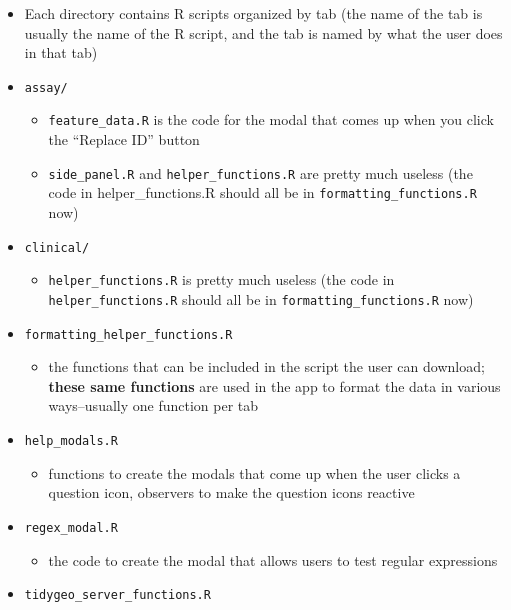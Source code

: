 \documentclass[]{article}
\providecommand{\tightlist}{%
  \setlength{\itemsep}{0pt}\setlength{\parskip}{0pt}}
\begin{document}
\begin{itemize}
  \begin{itemize}
  \tightlist
  \item
    Each directory contains R scripts organized by tab (the name of the
    tab is usually the name of the R script, and the tab is named by
    what the user does in that tab)
  \item
    \texttt{assay/}

    \begin{itemize}
    \tightlist
    \item
      \texttt{feature\_data.R} is the code for the modal that comes up
      when you click the ``Replace ID'' button
    \item
      \texttt{side\_panel.R} and \texttt{helper\_functions.R} are pretty
      much useless (the code in helper\_functions.R should all be in
      \texttt{formatting\_functions.R} now)
    \end{itemize}
  \item
    \texttt{clinical/}

    \begin{itemize}
    \tightlist
    \item
      \texttt{helper\_functions.R} is pretty much useless (the code in
      \texttt{helper\_functions.R} should all be in
      \texttt{formatting\_functions.R} now)
    \end{itemize}
  \item
    \texttt{formatting\_helper\_functions.R}

    \begin{itemize}
    \tightlist
    \item
      the functions that can be included in the script the user can
      download; \textbf{these same functions} are used in the app to
      format the data in various ways--usually one function per tab
    \end{itemize}
  \item
    \texttt{help\_modals.R}

    \begin{itemize}
    \tightlist
    \item
      functions to create the modals that come up when the user clicks a
      question icon, observers to make the question icons reactive
    \end{itemize}
  \item
    \texttt{regex\_modal.R}

    \begin{itemize}
    \tightlist
    \item
      the code to create the modal that allows users to test regular
      expressions
    \end{itemize}
  \item
    \texttt{tidygeo\_server\_functions.R}


\end{itemize}
\end{itemize}
\end{document}
